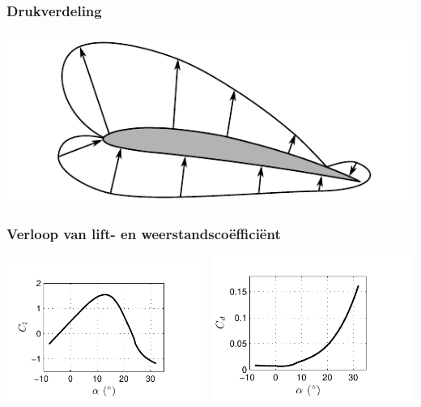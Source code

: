 \documentclass[t]{beamer}
\begin{document}
  	\begin{frame}
		\frametitle{Drukverdeling}
		\vspace{0.5cm}
		\includegraphics[width=\textwidth]{fig/uitwendige_stroming/Vleugelprofiel_drukverdeling}
  	\end{frame}
  	\begin{frame}
		\frametitle{Verloop van lift- en weerstandscoëfficiënt}
		\vspace{1cm}
		\center
		\includegraphics[width=0.49\textwidth]{fig/uitwendige_stroming/NACA_4412_Cl}
		\includegraphics[width=0.49\textwidth]{fig/uitwendige_stroming/NACA_4412_Cd}
  	\end{frame}
\end{document}
